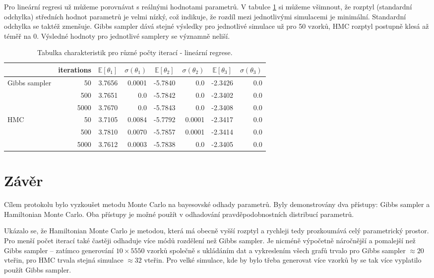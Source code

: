 \documentclass[11pt,oneside,american,czech]{article}
\newcommand{\E}{\mathbb{E}}
\begin{document}
Pro lineární regresi už můžeme porovnávat s reálnými hodnotami parametrů. V tabulce \ref{Tab: LR} si můžeme všimnout, že rozptyl (standardní odchylka) středních hodnot parametrů je velmi nízký, což indikuje, že rozdíl mezi jednotlivými simulacemi je minimální. Standardní odchylka se taktéž zmenšuje. Gibbs sampler dává stejné výsledky pro jednotlivé simulace už pro 50 vzorků, HMC rozptyl postupně klesá až téměř na 0. Výsledné hodnoty pro jednotlivé samplery se významně neliší.

\begin{table}[]
	\centering
		\begin{tabular}{lrrrrrrr}
			\toprule
			& \multicolumn{1}{c}{iterations} & \multicolumn{1}{c}{$\E[\theta_1]$} & \multicolumn{1}{c}{$\sigma(\theta_1)$} & \multicolumn{1}{c}{$\E[\theta_2]$} & \multicolumn{1}{c}{$\sigma(\theta_2)$} & \multicolumn{1}{c}{$\E[\theta_3]$} & \multicolumn{1}{c}{$\sigma(\theta_3)$} \\ \toprule
			\multirow{3}{*}{Gibbs sampler} & 50 & 3.7656 & 0.0001 & -5.7840 & 0.0 & -2.3426 & 0.0 \\
			& 500 & 3.7651 & 0.0 & -5.7842 & 0.0 & -2.3402 & 0.0 \\
			& 5000 & 3.7670 & 0.0 & -5.7843 & 0.0 & -2.3408 & 0.0 \\ \midrule
			\multirow{3}{*}{HMC} & 50 & 3.7105 & 0.0084 & -5.7792 & 0.0001 & -2.3417 & 0.0 \\
			& 500 & 3.7810 & 0.0070 & -5.7857 & 0.0001 & -2.3414 & 0.0 \\
			& 5000 & 3.7612 & 0.0003 & -5.7838 & 0.0 & -2.3405 & 0.0 \\ \bottomrule
	\end{tabular}
\caption{Tabulka charakteristik pro různé počty iterací - lineární regrese.}
\label{Tab: LR}
\end{table}


\section{Závěr}

Cílem protokolu bylo vyzkoušet metodu Monte Carlo na bayesovské odhady parametrů. Byly demonstrovány dva přístupy: Gibbs sampler a Hamiltonian Monte Carlo. Oba přístupy je možné použít v odhadování pravděpodobnostních distribucí parametrů.

Ukázalo se, že Hamiltonian Monte Carlo je metodou, která má obecně vyšší rozptyl a rychleji tedy prozkoumává celý parametrický prostor. Pro menší počet iterací také častěji odhaduje více módů rozdělení než Gibbs sampler. Je nicméně výpočetně náročnější a pomalejší než Gibbs sampler -- zatímco generování $10\times 5550$ vzorků společně s ukládáním dat a vykreslením všech grafů trvalo pro Gibbs sampler $\approx 20$ vteřin, pro HMC trvala stejná simulace $\approx 32$ vteřin. Pro velké simulace, kde by bylo třeba generovat více vzorků by se tak více vyplatilo použít Gibbs sampler.
\end{document}
